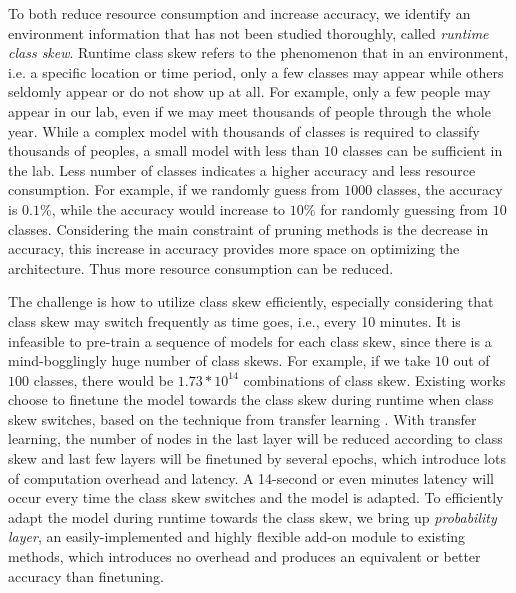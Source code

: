 \documentclass[pageno]{jpaper}
\begin{document}
To both reduce resource consumption and increase accuracy, we identify an environment information that has not been studied thoroughly, called \textit{runtime class skew}. Runtime class skew refers to the phenomenon that in an environment, i.e. a specific location or time period, only a few classes may appear while others seldomly appear or do not show up at all. For example, only a few people may appear in our lab, even if we may meet thousands of people through the whole year. While a complex model with thousands of classes is required to classify thousands of peoples, a small model with less than $10$ classes can be sufficient in the lab. Less number of classes indicates a higher accuracy and less resource consumption. For example, if we randomly guess from $1000$ classes, the accuracy is $0.1\%$, while the accuracy would increase to $10\%$ for randomly guessing from $10$ classes. Considering the main constraint of pruning methods is the decrease in accuracy, this increase in accuracy provides more space on optimizing the architecture. Thus more resource consumption can be reduced.

The challenge is how to utilize class skew efficiently, especially considering that class skew may switch frequently as time goes, i.e., every 10 minutes. It is infeasible to pre-train a sequence of models for each class skew, since there is a mind-bogglingly huge number of class skews. For example, if we take $10$ out of $100$ classes, there would be $1.73 \ast 10^{14}$ combinations of class skew. Existing works \cite{han2016mcdnn, shen2016fast} choose to finetune the model towards the class skew during runtime when class skew switches, based on the technique from transfer learning  \cite{doersch2015unsupervised, noroozi2016unsupervised, oquab2014learning, yosinski2014transferable}. With transfer learning, the number of nodes in the last layer will be reduced according to class skew and last few layers will be finetuned by several epochs, which introduce lots of computation overhead and latency. A 14-second or even minutes latency \cite{shen2016fast} will occur every time the class skew switches and the model is adapted. To efficiently adapt the model during runtime towards the class skew, we bring up \textit{probability layer}, an easily-implemented and highly flexible add-on module to existing methods, which introduces no overhead and produces an equivalent or better accuracy than finetuning.
\end{document}
